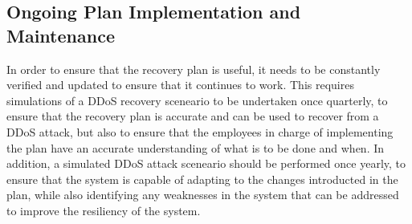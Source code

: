 \documentclass[12pt,a4paper]{article}
\begin{document}
\subsection{Ongoing Plan Implementation and Maintenance}
In order to ensure that the recovery plan is useful, it needs to be constantly verified and updated to ensure that it continues to work. This requires simulations of a DDoS recovery sceneario to be undertaken once quarterly, to ensure that the recovery plan is accurate and can be used to recover from a DDoS attack, but also to ensure that the employees in charge of implementing the plan have an accurate understanding of what is to be done and when. In addition, a simulated DDoS attack sceneario should be performed once yearly, to ensure that the system is capable of adapting to the changes introducted in the plan, while also identifying any weaknesses in the system that can be addressed to improve the resiliency of the system.
\end{document}
